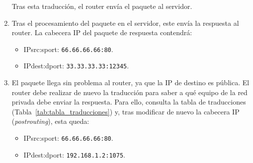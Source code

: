 \begin{ejemplo}
\begin{enumerate}[label=(\arabic*)]
        Tras esta traducción, el router envía el paquete al servidor.
        
        \item Tras el procesamiento del paquete en el servidor, este envía la respuesta al router. La cabecera IP del paquete de respuesta contendrá:
            \begin{itemize}
                \item {IPsrc}:{sport}: \verb|66.66.66.66:80|.
                \item {IPdest}:{dport}: \verb|33.33.33.33:12345|.
            \end{itemize}
        
        \item El paquete llega sin problema al router, ya que la IP de destino es pública. El router debe realizar de nuevo la traducción para saber a qué equipo de la red privada debe enviar la respuesta. Para ello, consulta la tabla de traducciones (Tabla~\ref{tab:tabla_traducciones}) y, tras modificar de nuevo la cabecera IP (\textit{postrouting}), esta queda:
            \begin{itemize}
                \item {IPsrc}:{sport}: \verb|66.66.66.66:80|.
                \item {IPdest}:{dport}: \verb|192.168.1.2:1075|.
            \end{itemize}
    \end{enumerate}
\end{ejemplo}



